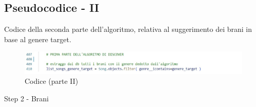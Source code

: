 \subsection{Pseudocodice - II}
Codice della seconda parte dell'algoritmo, relativa al suggerimento 
dei brani in base al genere target.
\begin{figure}[H]
    \centering
    \includegraphics[scale=0.7]{images/alg2.jpg}
    \caption{Codice (parte II)}
    \label{fig-codice2}
\end{figure}
\vspace{1.5cm}

\begin{algorithm}[H]
    \caption{Step 2 - Brani}
    \SetAlgoLined
   
\end{algorithm}





\newpage

